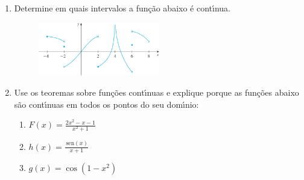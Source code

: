 \documentclass[a4paper,5pt]{amsbook}
\newcommand{\sen}{\,\mbox{sen}}
\newcommand{\ds}{\displaystyle}
\newcommand{\ra}{\rightarrow}
\begin{document}
\begin{enumerate}
        \noindent{}

    \vspace{0.5cm}
    \item Determine em quais intervalos a fun\c{c}\~ao abaixo \'e cont\'{\i}nua.
        \begin{figure}[h]
            \centering
            \includegraphics[width=0.5\textwidth]{lista-00-fig3.png}
        \end{figure}

    \vspace{0.5cm}
    \item Use os teoremas sobre fun\c{c}\~oes cont\'{\i}nuas e explique porque as
        fun\c{c}\~oes abaixo s\~ao cont\'{\i}nuas em todos os pontos do seu dom\'{\i}nio:
        \begin{enumerate}
            \vspace{0.3cm}
            \item $F(x)=\ds\frac{2x^2-x-1}{x^2+1}$
            \vspace{0.3cm}
            \item $h(x)=\ds\frac{\sen(x)}{x+1}$
            \vspace{0.3cm}
            \item $g(x)=\cos(1-x^2)$
        \end{enumerate}


\end{enumerate}
\end{document}
